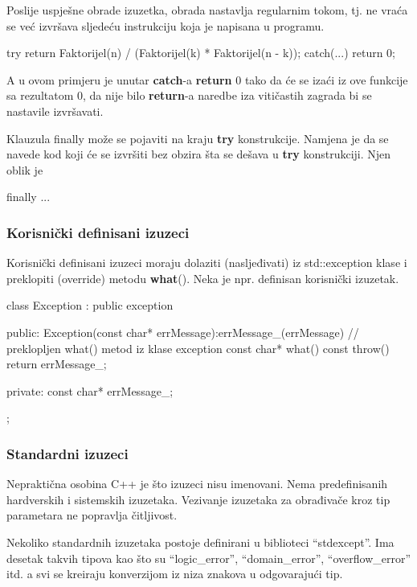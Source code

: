 \documentclass[11pt]{book}
\begin{document}
Poslije  uspješne  obrade  izuzetka,  obrada  nastavlja  regularnim  tokom,  tj.  ne  vraća  se  već izvršava sljedeću instrukciju koja je napisana u programu.
\begin{shortlisting}
  try {
      return Faktorijel(n) / (Faktorijel(k) * Faktorijel(n - k));
    }
  catch(...) {
      return 0;
    }
\end{shortlisting}
A  u  ovom  primjeru  je  unutar  \textbf{catch}-a  \textbf{return}  0  tako  da  će  se  izaći  iz  ove  funkcije  sa rezultatom 0, da nije bilo \textbf{return}-a naredbe iza vitičastih zagrada bi se nastavile izvršavati.

Klauzula finally može se pojaviti na kraju \textbf{try} konstrukcije. Namjena je da se navede kod koji će se izvršiti bez obzira šta se dešava u \textbf{try} konstrukciji. Njen oblik je

\begin{shortlisting}
  finally {
      ...
    }

\end{shortlisting}

\subsubsection{Korisnički definisani izuzeci}
Korisnički  definisani  izuzeci  moraju  dolaziti  (nasljeđivati)  iz  std::exception  klase  i  preklopiti (override) metodu \textbf{what}(). Neka je npr. definisan korisnički izuzetak.
\begin{shortlisting}
  class Exception : public exception
    {
      public:
      Exception(const char* errMessage):errMessage_(errMessage){}
      // preklopljen what() metod iz klase exception
      const char* what() const throw() { return errMessage_; }

      private:
      const char* errMessage_;
    };
\end{shortlisting}

\subsubsection{Standardni izuzeci}

Nepraktična osobina C++ je što izuzeci nisu imenovani. Nema predefinisanih hardverskih i sistemskih  izuzetaka.  Vezivanje  izuzetaka  za  obrađivače  kroz  tip  parametara  ne popravlja čitljivost.

Nekoliko standardnih izuzetaka postoje  definirani  u  biblioteci  “stdexcept”.  Ima  desetak  takvih  tipova  kao  što  su “logic\_error”, “domain\_error”,  “overflow\_error”  itd.  a  svi  se  kreiraju  konverzijom  iz  niza  znakova  u odgovarajući tip.
\end{document}
